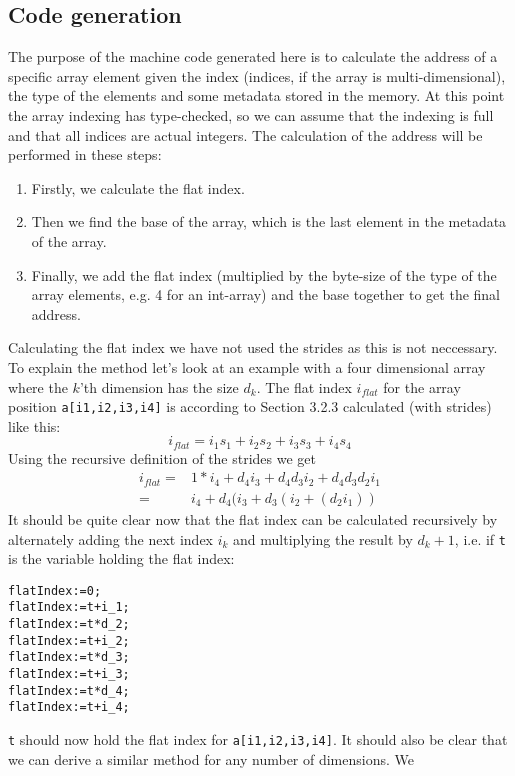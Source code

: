 \documentclass{article}
\begin{document}
\subsection{Code generation}
The purpose of the machine code generated here is to calculate the address of a specific array element given the index (indices, if the array is multi-dimensional), the type of the elements and some metadata stored in the memory. At this point the array indexing has type-checked, so we can assume that the indexing is full and that all indices are actual integers. The calculation of the address will be performed in these steps:
\begin{enumerate}
  \item Firstly, we calculate the flat index.
  \item Then we find the base of the array, which is the last element in the metadata of the array.
  \item Finally, we add the flat index (multiplied by the byte-size of the type of the array elements, e.g. 4 for an int-array) and the base together to get the final address.
\end{enumerate}
Calculating the flat index we have not used the strides as this is not neccessary. To explain the method let's look at an example with a four dimensional array where the $k$'th dimension has the size $d_k$. The flat index $i_{flat}$ for the array position \texttt{a[i1,i2,i3,i4]} is
according to Section 3.2.3 calculated (with strides) like this:
\begin{equation*}
i_{flat} = i_1 s_1 + i_2 s_2 + i_3 s_3 + i_4 s_4
\end{equation*}
Using the recursive definition of the strides we get
\begin{align*}
i_{flat} = & 1*i_4 + d_4 i_3 + d_4 d_3 i_2 + d_4 d_3 d_2 i_1 \\
       =  & i_4 + d_4 (i_3 + d_3 (i_2 + (d_2 i_1))
\end{align*}
It should be quite clear now that the flat index can be calculated recursively by alternately
adding the next index $i_k$ and multiplying the result by $d_k+1$, i.e. if \texttt{t} is the
variable holding the flat index:
\begin{verbatim}
flatIndex:=0;
flatIndex:=t+i_1;
flatIndex:=t*d_2;
flatIndex:=t+i_2;
flatIndex:=t*d_3;
flatIndex:=t+i_3;
flatIndex:=t*d_4;
flatIndex:=t+i_4;
\end{verbatim}
\texttt{t} should now hold the flat index for \texttt{a[i1,i2,i3,i4]}.
It should also be clear that we can derive a similar method for any number of dimensions. We
\end{document}

